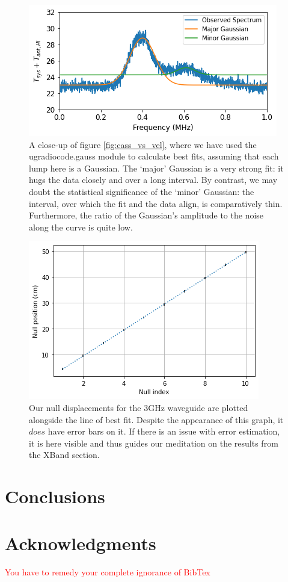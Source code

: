 \documentclass[12pt]{article}
\begin{document}
\begin{figure}
\centering
	\includegraphics[width=.6\linewidth]{gauss}
	\caption{A close-up of figure \ref{fig:cass_vs_vel}, where we have used the ugradiocode.gauss module to calculate best fits, assuming that each lump here is a Gaussian. The `major' Gaussian is a very strong fit: it hugs the data closely and over a long interval. By contrast, we may doubt the statistical significance of the `minor' Gaussian: the interval, over which the fit and the data align, is comparatively thin. Furthermore, the ratio of the Gaussian's amplitude to the noise along the curve is quite low.}
	\label{fig:gauss}
\end{figure}



\begin{figure}
\centering
	\includegraphics[width=.6\linewidth]{lame_waveguide}
	\caption{Our null displacements for the 3GHz waveguide are plotted alongside the line of best fit. Despite the appearance of this graph, it $does$ have error bars on it. If there is an issue with error estimation, it is here visible and thus guides our meditation on the results from the XBand section.}
	\label{fig:3GHz}
\end{figure}

\section{Conclusions}

\quad \quad 


\section{Acknowledgments}

\quad \quad \textcolor{red}{You have to remedy your complete ignorance of BibTex}
\end{document}
